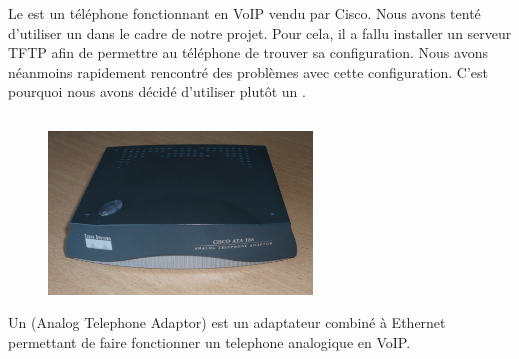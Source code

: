 Le {\cph} est un téléphone fonctionnant en VoIP vendu par Cisco. Nous avons tenté d'utiliser un {\cph} dans le cadre de notre projet. Pour cela, il a fallu installer un serveur TFTP afin de permettre au téléphone de trouver sa configuration.
Nous avons néanmoins rapidement rencontré des problèmes avec cette configuration.
C'est pourquoi nous avons décidé d'utiliser plutôt un {\ata}. 

\subsection{\cata}

\begin{figure}[h]
\begin{center}
\includegraphics[width=7cm]{images/ata.jpg}
\end{center}
\caption{\ata}
\end{figure}

Un {\ata} (Analog Telephone Adaptor) est un adaptateur combiné à Ethernet permettant de faire fonctionner un telephone analogique en VoIP.

